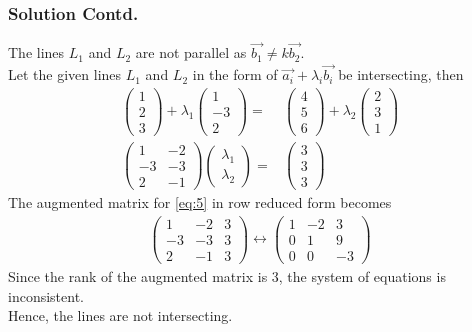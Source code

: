 \documentclass{beamer}
\newcommand{\myvec}[1]{\ensuremath{\begin{pmatrix}#1\end{pmatrix}}}
\begin{document}
\begin{frame}
\frametitle{Solution Contd.}
The lines $L_{1}$ and $L_{2}$ are not parallel as $\Vec{b_{1}}\neq k\Vec{b_{2}}$.\\
Let the given lines $L_{1}$ and $L_{2}$ in the form of $\Vec{a_{i}}+\lambda_{i}\Vec{b_{i}}$ be intersecting, then
\begin{align}
    \label{eq:4}
    \myvec{1 \\ 2\\ 3 } +\lambda_{1}\myvec{1 \\ -3 \\ 2} ={}& \myvec{4 \\ 5\\ 6} + \lambda_{2}\myvec{2 \\ 3 \\ 1} \\
    \label{eq:5}
    \myvec{1 & -2\\ -3 &-3 \\ 2 & -1}\myvec{\lambda_{1}\\ \lambda_{2}}={}&\myvec{3 \\ 3\\ 3 }
\end{align}
The augmented matrix for \eqref{eq:5} in row reduced form becomes
\begin{align}
\label{eq:6}
\myvec{1 & -2 & 3\\ -3 &-3 & 3\\ 2 & -1 & 3} \longleftrightarrow \myvec{1 & -2 & 3\\ 0 & 1 & 9\\ 0 & 0 & -3}
\end{align}
Since the rank of the augmented matrix is 3, the system of equations is inconsistent.\\
Hence, the lines are not intersecting.
\end{frame}
\end{document}
